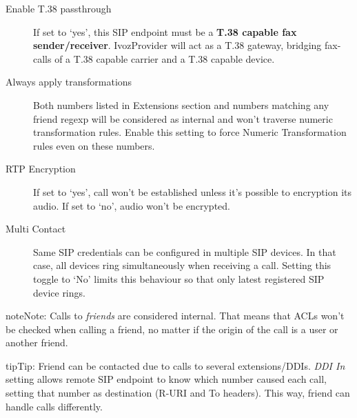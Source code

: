 \documentclass[letterpaper,10pt,english]{sphinxmanual}
\begin{document}
\begin{description}
\item[{Enable T.38 passthrough}] \leavevmode{}\label{administration_portal/client/vpbx/routing_endpoints/friends/remote_friends:term-enable-t-38-passthrough}
If set to `yes', this SIP endpoint must be a \textbf{T.38 capable fax sender/receiver}. IvozProvider
will act as a T.38 gateway, bridging fax-calls of a T.38 capable carrier and a T.38 capable device.

\item[{Always apply transformations}] \leavevmode{}\label{administration_portal/client/vpbx/routing_endpoints/friends/remote_friends:term-always-apply-transformations}
Both numbers listed in Extensions section and numbers matching any friend regexp will be considered as internal and
won't traverse numeric transformation rules.  Enable this setting to force Numeric Transformation rules even on these numbers.

\item[{RTP Encryption}] \leavevmode{}\label{administration_portal/client/vpbx/routing_endpoints/friends/remote_friends:term-rtp-encryption}
If set to `yes', call won't be established unless it's possible to encryption its audio. If set to `no',
audio won't be encrypted.

\item[{Multi Contact}] \leavevmode{}\label{administration_portal/client/vpbx/routing_endpoints/friends/remote_friends:term-multi-contact}
Same SIP credentials can be configured in multiple SIP devices. In that case, all devices ring
simultaneously when receiving a call. Setting this toggle to `No' limits this behaviour so that
only latest registered SIP device rings.

\end{description}

\begin{notice}{note}{Note:}
Calls to \emph{friends} are considered internal. That means that ACLs won't
be checked when calling a friend, no matter if the origin of the call
is a user or another friend.
\end{notice}

\begin{notice}{tip}{Tip:}
Friend can be contacted due to calls to several extensions/DDIs. \emph{DDI In} setting allows remote SIP endpoint to
know which number caused each call, setting that number as destination (R-URI and To headers). This way, friend
can handle calls differently.
\end{notice}
\end{document}
